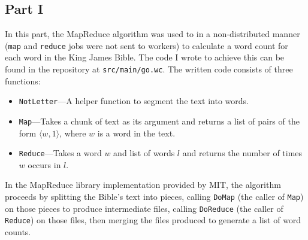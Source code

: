 \documentclass[11pt,a4paper]{report}
\begin{document}
	\subsection{Part I}
	In this part, the MapReduce algorithm was used to in a non-distributed manner (\verb=map= and \verb=reduce= jobs were not sent to workers) to calculate a word count for each word in the King James Bible. The code I wrote to achieve this can be found in the repository at \verb=src/main/go.wc=. The written code consists of three functions:
	\begin{itemize}
		\item \verb=NotLetter=---A helper function to segment the text into words.
		\item \verb=Map=---Takes a chunk of text as its argument and returns a list of pairs of the form $\langle w, 1 \rangle$, where $w$ is a word in the text.
		\item \verb=Reduce=---Takes a word $w$ and list of words $l$ and returns the number of times $w$ occurs in $l$.
	\end{itemize}
	
	In the MapReduce library implementation provided by MIT, the algorithm proceeds by splitting the Bible's text into pieces, calling \verb=DoMap= (the caller of \verb=Map=) on those pieces to produce intermediate files, calling \verb=DoReduce= (the caller of \verb=Reduce=) on those files, then merging the files produced to generate a list of word counts.
	
\end{document}
